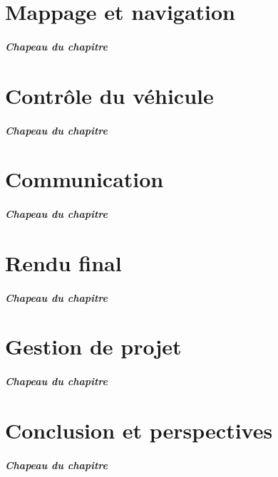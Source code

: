 \documentclass[12pt, french]{report}
\begin{document}
\chapter{Mappage et navigation}
\paragraph{Chapeau du chapitre}

\clearpage

\chapter{Contrôle du véhicule}
\paragraph{Chapeau du chapitre}

\clearpage

\chapter{Communication}
\paragraph{Chapeau du chapitre}

\clearpage

\chapter{Rendu final}
\paragraph{Chapeau du chapitre}

\clearpage

\chapter{Gestion de projet}
\paragraph{Chapeau du chapitre}

\clearpage

\chapter{Conclusion et perspectives}
\paragraph{Chapeau du chapitre}

\clearpage



\clearpage


\clearpage
\end{document}
